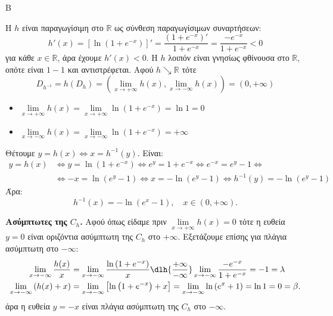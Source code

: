 \begin{thema}{Β}
\begin{erwthma}[resume]
\item Η $h$ είναι παραγωγίσιμη στο $\mathbb{R}$ ως σύνθεση παραγωγίσιμων συναρτήσεων:
\[
h'(x)=\left[\ln\left(1+e^{-x}\right)\right]'=\frac{\left(1+e^{-x}\right)'}{1+e^{-x}}=\frac{-e^{-x}}{1+e^{-x}}<0
\]
για κάθε $x\in\mathbb{R}$, άρα έχουμε $h'(x)<0$. Η $h$ λοιπόν είναι γνησίως φθίνουσα στο $\mathbb{R}$, οπότε είναι $1-1$ και αντιστρέφεται. Αφού $h\searrow\mathbb{R}$ τότε
\[D_{h^{-1}}=h(D_h)=\left(\lim\limits_{x\to+\infty}{h(x)},\lim\limits_{x\to -\infty}{h(x)}\right)=(0,+\infty)\]
\begin{itemize}
\item $\lim\limits_{x\to+\infty}{h(x)}=\lim\limits_{x\to +\infty}{\ln\left(1+e^{-x}\right)}=\ln{1}=0$
\item $\lim\limits_{x\to -\infty}{h(x)}=\lim\limits_{x\to-\infty}{\ln\left(1+e^{-x}\right)}=+\infty$
\end{itemize}
Θέτουμε $y=h(x)\Leftrightarrow x=h^{-1}(y)$. Είναι:
\begin{align*}
y=h(x)&\Leftrightarrow y=\ln\left(1+e^{-x}\right)\Leftrightarrow e^y=1+e^{-x}\Leftrightarrow e^{-x}=e^y-1\Leftrightarrow\\&\Leftrightarrow -x=\ln(e^y-1)\Leftrightarrow x=-\ln(e^y-1)\Leftrightarrow h^{-1}(y)=-\ln(e^y-1)
\end{align*}
Άρα:
\[
h^{-1}(x)=-\ln(e^x-1),\quad x\in(0,+\infty).
\]

\item \textbf{Ασύμπτωτες της $C_{h}$.}
Αφού όπως είδαμε πριν $\lim\limits_{x\to +\infty}{h(x)}=0$ τότε η ευθεία $y=0$ είναι οριζόντια ασύμπτωτη της $C_h$ στο $+\infty$. Εξετάζουμε επίσης για πλάγια ασύμπτωτη στο $-\infty$:
\begin{align*}
\lim\limits_{x\to -\infty}{\frac{h(x)}{x}}&=\lim\limits_{x\to -\infty}{\frac{\ln\left(1+e^{-x}\right)}{x}}\dlh{\frac{+\infty}{-\infty}}\lim\limits_{x\to -\infty}{\frac{-e^{-x}}{1+e^{-x}}}=-1=\lambda\\
\lim\limits_{x\to -\infty}{\left(h(x)+x\right)}&=\lim\limits_{x\to-\infty}{\left[\ln\left(1+e^{-x}\right)+x\right]}=\lim\limits_{x\to-\infty}{\ln{\left(e^x+1\right)}}=\ln1=0=\beta.
\end{align*}
άρα η ευθεία $y=-x$ είναι πλάγια ασύμπτωτη της $C_h$ στο $-\infty$.


\end{erwthma}
\end{thema}

